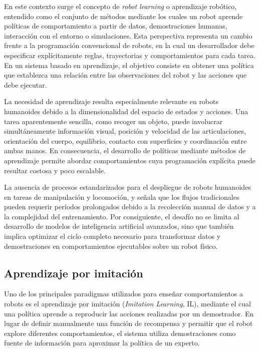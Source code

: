 \documentclass[stu,12pt,floatsintext]{apa7}
\begin{document}
En este contexto surge el concepto de \textit{robot learning} o aprendizaje robótico, entendido como el conjunto de métodos mediante los cuales un robot aprende políticas de comportamiento a partir de datos, demostraciones humanas, interacción con el entorno o simulaciones. Esta perspectiva representa un cambio frente a la programación convencional de robots, en la cual un desarrollador debe especificar explícitamente reglas, trayectorias y comportamientos para cada tarea. En un sistema basado en aprendizaje, el objetivo consiste en obtener una política que establezca una relación entre las observaciones del robot y las acciones que debe ejecutar.

La necesidad de aprendizaje resulta especialmente relevante en robots humanoides debido a la dimensionalidad del espacio de estados y acciones. Una tarea aparentemente sencilla, como recoger un objeto, puede involucrar simultáneamente información visual, posición y velocidad de las articulaciones, orientación del cuerpo, equilibrio, contacto con superficies y coordinación entre ambas manos. En consecuencia, el desarrollo de políticas mediante métodos de aprendizaje permite abordar comportamientos cuya programación explícita puede resultar costosa y poco escalable.

La ausencia de procesos estandarizados para el despliegue de robots humanoides en tareas de manipulación y locomoción, y señala que los flujos tradicionales pueden requerir períodos prolongados debido a la recolección manual de datos y a la complejidad del entrenamiento. Por consiguiente, el desafío no se limita al desarrollo de modelos de inteligencia artificial avanzados, sino que también implica optimizar el ciclo completo necesario para transformar datos y demostraciones en comportamientos ejecutables sobre un robot físico.

\subsection{Aprendizaje por imitación}

Uno de los principales paradigmas utilizados para enseñar comportamientos a robots es el aprendizaje por imitación (\textit{Imitation Learning}, IL), mediante el cual una política aprende a reproducir las acciones realizadas por un demostrador. En lugar de definir manualmente una función de recompensa y permitir que el robot explore diferentes comportamientos, el sistema utiliza demostraciones como fuente de información para aproximar la política de un experto.
\end{document}
